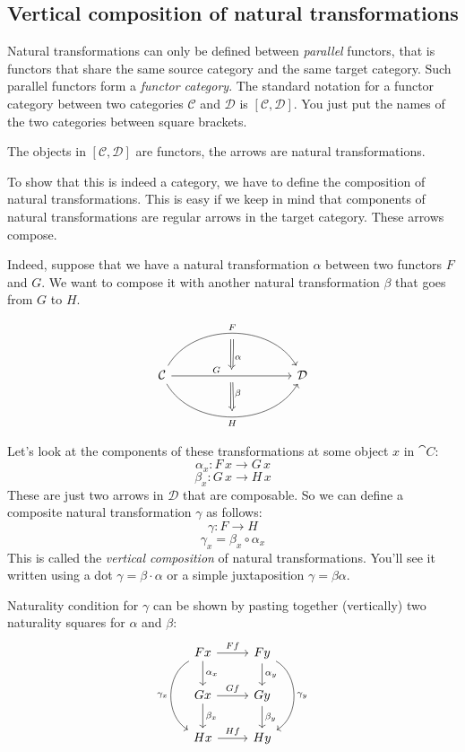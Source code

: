 \documentclass[DaoFP]{subfiles}
\begin{document}
\subsection{Vertical composition of natural transformations}

Natural transformations can only be defined between \emph{parallel} functors, that is functors that share the same source category and the same target category. Such parallel functors form a \emph{functor category}. The standard notation for a functor category between two categories $\mathcal{C}$ and $\mathcal{D}$ is $[\mathcal{C}, \mathcal{D}]$. You just put the names of the two categories between square brackets.

The objects in $[\mathcal{C}, \mathcal{D}]$ are functors, the arrows are natural transformations. 

To show that this is indeed a category, we have to define the composition of natural transformations. This is easy if we keep in mind that components of natural transformations are regular arrows in the target category. These arrows compose.

Indeed, suppose that we have a natural transformation $\alpha$ between two functors $F$ and $G$. We want to compose it with another natural transformation $\beta$ that goes from $G$ to $H$. 

\[
\begin{tikzcd}[column sep=huge]
\mathcal{C}
  \arrow[bend left=60, rr, "F", ""{name=U, below}]
  \arrow[rr, "G"{xshift=-12pt}, ""{name=Mbot, below}, ""{name=Mtop, above}]
  \arrow[bend right=60, rr, "H"', ""{name=D, above}]
&&
\mathcal{D}
  \arrow[Rightarrow, from=U, to=Mbot, "\alpha", shorten >=5pt]
  \arrow[Rightarrow, from=Mtop, to=D, "\beta", shorten <=5pt]
\end{tikzcd}
\]

Let's look at the components of these transformations at some object $x$ in $\cat C$:
\[ \alpha_x \colon F \, x \to G \, x \]
\[ \beta_x \colon G \, x \to H \, x \]
These are just two arrows in $\mathcal{D}$ that are composable. So we can define a composite natural transformation $\gamma$ as follows:
\[ \gamma \colon F \to H\]
\[ \gamma_x = \beta_x \circ \alpha_x \]
 This is called the \emph{vertical composition} of natural transformations. You'll see it written using a dot $\gamma = \beta \cdot \alpha$ or a simple juxtaposition $\gamma = \beta \alpha$.
 
Naturality condition for $\gamma$ can be shown by pasting together (vertically) two naturality squares for $\alpha$ and $\beta$:
\[
 \begin{tikzcd}
 F x
 \arrow[d, "\alpha_x"]
 \arrow[r, "F f"]
 \arrow[dd, bend right = 60, "\gamma_x"']
 &
F y
  \arrow[d, "\alpha_y"]
 \arrow[dd, bend left = 60, "\gamma_y"]
 \\
G x
 \arrow[r, "G f"]
 \arrow[d, "\beta_x"]
& G y
\arrow[d, "\beta_y"]
\\
H x
\arrow[r, "H f"]
& H y
 \end{tikzcd}
\]
\end{document}
